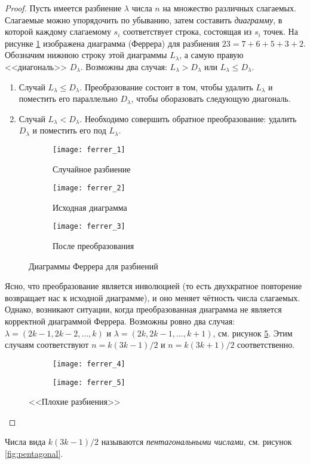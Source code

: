 \documentclass[a5paper]{article}
\theoremstyle{definition}
\begin{document}
\begin{proof}
	Пусть имеется разбиение \( \lambda \) числа \( n \) на множество различных 
	слагаемых. 
	Слагаемые можно упорядочить по убыванию, затем составить 
	\textit{диаграмму}, в которой каждому слагаемому \( s_i \) соответствует 
	строка, состоящая из \( s_i \) точек. На рисунке \ref{fig:ferrer_1} 
	изображена диаграмма (Феррера) для разбиения \( 23 = 7+6+5+3+2 \). 
	Обозначим нижнюю строку этой диаграммы \( L_{\lambda} \), а самую правую 
	<<диагональ>> \( D_{\lambda} \). Возможны два случая: \( L_{\lambda} > 
	D_{\lambda} \) или \( L_{\lambda} \leq D_{\lambda} \).
	\begin{enumerate}
	\item Случай \( L_{\lambda} \leq D_{\lambda} \). Преобразование состоит в 
	том, чтобы удалить \( L_{\lambda} \) и поместить его параллельно \( 
	D_{\lambda} \), чтобы оборазовать следующую диагональ.
	\item Случай \( L_{\lambda} < D_{\lambda} \). Необходимо совершить обратное 
	преобразование: удалить \( D_{\lambda} \) и поместить его под \( 
	L_{\lambda} \).
	\end{enumerate}
\begin{figure}[h]
\centering
\begin{subfigure}{.33\textwidth}
	\centering
	\texttt{[image: ferrer\_1]}
	\caption{Случайное разбиение}
	\label{fig:ferrer_1}	
\end{subfigure}%
\begin{subfigure}{.33\textwidth}
	\centering
	\texttt{[image: ferrer\_2]}
	\caption{Исходная диаграмма}
	\label{fig:ferrer_2}	
\end{subfigure}
\begin{subfigure}{.33\textwidth}
	\centering
	\texttt{[image: ferrer\_3]}
	\caption{После преобразования}
	\label{fig:ferrer_3}	
\end{subfigure}
\caption{Диаграммы Феррера для разбиений}
\end{figure}
Ясно, что преобразование является инволюцией (то есть двухкратное 
повторение возвращает нас к исходной диаграмме), и оно меняет чётность 
числа слагаемых. Однако, возникают ситуации, когда преобразованная 
диаграмма не является корректной диаграммой Феррера. Возможны ровно два случая: 
\( \lambda = (2k-1, 2k-2, \ldots,k) \) и \( \lambda = (2k, 2k-1, \ldots, k+1) 
\), см. рисунок \ref{fig:ferrer_4}. Этим случаям соответствуют \( n = k(3k-1)/2 
\) и \( n = k(3k+1)/2 \) соответственно.
\begin{figure}[h]
\centering
\begin{subfigure}{.4\textwidth}
	\centering
	\texttt{[image: ferrer\_4]}
\end{subfigure}%
\begin{subfigure}{.4\textwidth}
	\centering
	\texttt{[image: ferrer\_5]}
\end{subfigure}
\caption{<<Плохие разбиения>>}
\label{fig:ferrer_4}	
\end{figure}
\end{proof}
Числа вида \( k(3k-1)/2 \) называются \textit{пентагональными числами}, см. 
рисунок \ref{fig:pentagonal}.
\end{document}
